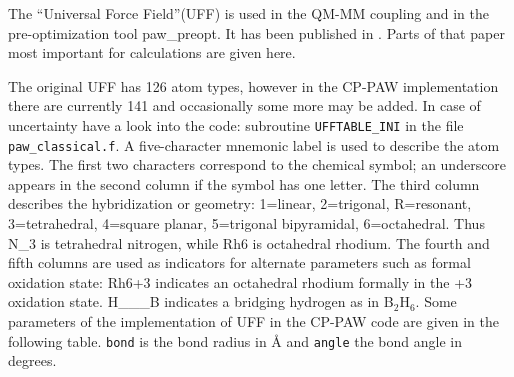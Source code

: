 \documentclass[final,12pt]{article}
\begin{document}
{{{{{{The ``Universal Force Field''(UFF)\cite{rappe92_jacs114_10024} is used in the QM-MM
coupling and in the pre-optimization tool paw\_preopt. It has been
published in \cite{rappe92_jacs114_10024}. Parts of that paper most important for
calculations are given here.

The original UFF has 126 atom types, however in the CP-PAW
implementation there are currently 141 and occasionally some more may
be added. In case of uncertainty have a look into the code: subroutine
\texttt{UFFTABLE\_INI} in the file \texttt{paw\_classical.f}. A
five-character mnemonic label is used to describe the atom types. The
first two characters correspond to the chemical symbol; an underscore
appears in the second column if the symbol has one letter. The third
column describes the hybridization or geometry: 1=linear, 2=trigonal,
R=resonant, 3=tetrahedral, 4=square planar, 5=trigonal bipyramidal,
6=octahedral. Thus N\_3 is tetrahedral nitrogen, while Rh6 is
octahedral rhodium. The fourth and fifth columns are used as indicators
for alternate parameters such as formal oxidation state: Rh6+3
indicates an octahedral rhodium formally in the +3 oxidation
state. H\_\_\_B indicates a bridging hydrogen as in B$_2$H$_6$.  Some
parameters of the implementation of UFF in the CP-PAW code are given
in the following table. \verb'bond' is the bond radius in \AA{} and
\verb'angle' the bond angle in degrees.

}}}}}}
\end{document}
